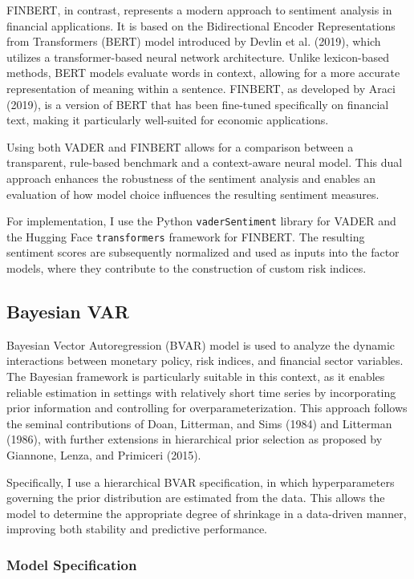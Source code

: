 \documentclass[12pt,a4paper]{report}\usepackage[a4paper, top=2.5cm, bottom=2.5cm, left=2.5cm, right=2.5cm]{geometry}
\begin{document}
FINBERT, in contrast, represents a modern approach to sentiment analysis in financial applications.
It is based on the Bidirectional Encoder Representations from Transformers (BERT) model introduced
by Devlin et al. (2019), which utilizes a transformer-based neural network architecture. Unlike
lexicon-based methods, BERT models evaluate words in context, allowing for a more accurate
representation of meaning within a sentence. FINBERT, as developed by Araci (2019), is a version of
BERT that has been fine-tuned specifically on financial text, making it particularly well-suited for
economic applications.

Using both VADER and FINBERT allows for a comparison between a transparent, rule-based benchmark and
a context-aware neural model. This dual approach enhances the robustness of the sentiment analysis
and enables an evaluation of how model choice influences the resulting sentiment measures.

For implementation, I use the Python \texttt{vaderSentiment} library for VADER and the Hugging Face
\texttt{transformers} framework for FINBERT. The resulting sentiment scores are subsequently
normalized and used as inputs into the factor models, where they contribute to the construction of
custom risk indices.

\subsection{Bayesian VAR}

Bayesian Vector Autoregression (BVAR) model is used to analyze the dynamic
interactions between monetary policy, risk indices, and financial sector variables. The Bayesian
framework is particularly suitable in this context, as it enables reliable estimation in settings
with relatively short time series by incorporating prior information and controlling for
overparameterization. This approach follows the seminal contributions of Doan, Litterman, and Sims
(1984) and Litterman (1986), with further extensions in hierarchical prior selection as proposed by
Giannone, Lenza, and Primiceri (2015).

Specifically, I use a hierarchical BVAR specification, in which hyperparameters governing the prior
distribution are estimated from the data. This allows the model to determine the appropriate degree
of shrinkage in a data-driven manner, improving both stability and predictive performance.

\subsubsection*{Model Specification}
\end{document}
